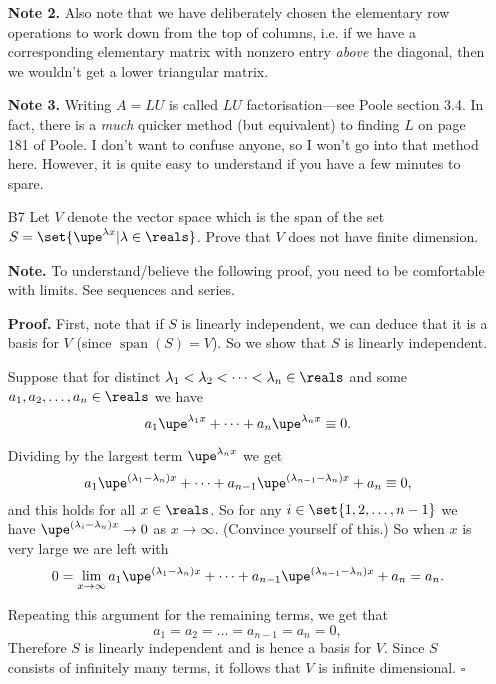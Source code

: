 \documentclass[english,12pt,a4paper]{scrartcl}
\DeclareMathOperator{\spn}{span}
\begin{document}
\begin{itemize}
    \textbf{Note 2.} Also note that we have deliberately chosen the elementary 
    row operations to work down from the top of columns, i.e. if we have a 
    corresponding elementary matrix with nonzero entry \emph{above} the 
    diagonal, then we wouldn't get a lower triangular matrix.

    \textbf{Note 3.} Writing $A = LU$ is called $LU$ factorisation---see Poole 
    section 3.4. In fact, there is a \emph{much} quicker method (but 
    equivalent) to finding $L$ on page 181 of Poole. I don't want to confuse 
    anyone, so I won't go into that method here. However, it is quite easy to 
    understand if you have a few minutes to spare.
  \item[B7] Let $V$ denote the vector space which is the span of the set $S = 
    \set{\upe^{\lambda x} | \lambda \in \reals}$. Prove that $V$ does not have 
    finite dimension.

    \textbf{Note.} To understand/believe the following proof, you need to be 
    comfortable with limits. See sequences and series.

    \textbf{Proof.} First, note that if $S$ is linearly independent, we can 
    deduce that it is a basis for $V$ (since $\spn(S) = V$). So we show that 
    $S$ is linearly independent.

    Suppose that for distinct $\lambda_1 < \lambda_2 < \dots < \lambda_n \in 
    \reals$ and some $a_1, a_2, \dots, a_n \in \reals$ we have
    \begin{equation} \label{eqn:sum1}
      a_1 \upe^{\lambda_1 x} + \dots + a_n \upe^{\lambda_n x} \equiv 0.
    \end{equation}

    Dividing by the largest term $\upe^{\lambda_n x}$ we get
    \[
      a_1 \upe^{(\lambda_1 - \lambda_n) x} + \dots + a_{n - 1} 
      \upe^{(\lambda_{n - 1} - \lambda_n) x} + a_n \equiv 0,
    \]
    and this holds for all $x \in \reals$. So for any $i \in \set{1, 2, \dots, 
    n - 1}$ we have $\upe^{(\lambda_i - \lambda_n) x} \to 0$ as $x \to \infty$.  
    (Convince yourself of this.) So when $x$ is very large we are left with
    \begin{equation} \label{eqn:limsum}
      0 = \lim_{x \to \infty} a_1 \upe^{(\lambda_1 - \lambda_n) x} + \dots + 
      a_{n - 1} \upe^{(\lambda_{n - 1} - \lambda_n) x} + a_n = a_n.
    \end{equation}

    Repeating this argument for the remaining terms, we get that
    \[
      a_1 = a_2 = \dots = a_{n - 1} = a_n = 0,
    \]
    Therefore $S$ is linearly independent and is hence a basis for $V$. Since 
    $S$ consists of infinitely many terms, it follows that $V$ is infinite 
    dimensional. \hfill $\square$


\end{itemize}
\end{document}
